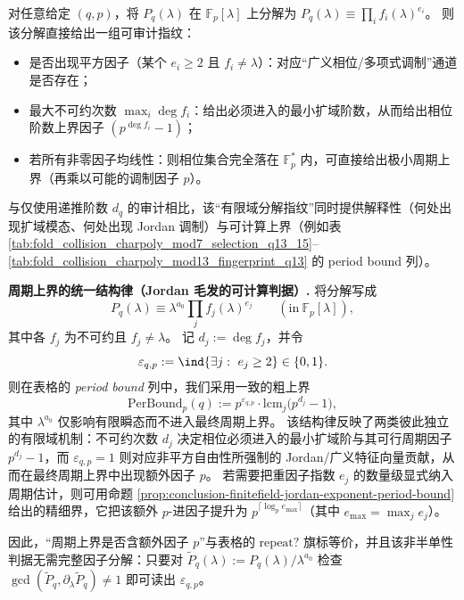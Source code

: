 \begin{remark}\label{rem:pom-charpoly-modp-audit-method}
对任意给定 \((q,p)\)，将 \(P_q(\lambda)\) 在 \(\mathbb{F}_p[\lambda]\) 上分解为
\(
P_q(\lambda)\equiv \prod_i f_i(\lambda)^{e_i}
 \)。
则该分解直接给出一组可审计指纹：
\begin{itemize}
  \item 是否出现平方因子（某个 \(e_i\ge 2\) 且 \(f_i\neq \lambda\)）：对应“广义相位/多项式调制”通道是否存在；
  \item 最大不可约次数 \(\max_i \deg f_i\)：给出必须进入的最小扩域阶数，从而给出相位阶数上界因子 \((p^{\deg f_i}-1)\)；
  \item 若所有非零因子均线性：则相位集合完全落在 \(\mathbb{F}_p^\ast\) 内，可直接给出极小周期上界（再乘以可能的调制因子 \(p\)）。
\end{itemize}
与仅使用递推阶数 \(d_q\) 的审计相比，该“有限域分解指纹”同时提供解释性（何处出现扩域模态、何处出现 Jordan 调制）与可计算上界（例如表 \ref{tab:fold_collision_charpoly_mod7_selection_q13_15}--\ref{tab:fold_collision_charpoly_mod13_fingerprint_q13} 的 period bound 列）。
\par
\textbf{周期上界的统一结构律（Jordan 毛发的可计算判据）.}
将分解写成
\[
P_q(\lambda)\equiv \lambda^{a_0}\prod_{j} f_j(\lambda)^{e_j}\qquad(\mathrm{in}\ \mathbb{F}_p[\lambda]),
\]
其中各 \(f_j\) 为不可约且 \(f_j\neq \lambda\)。
记 \(d_j:=\deg f_j\)，并令
\[
\varepsilon_{q,p}:=\ind\{\exists j:\ e_j\ge 2\}\in\{0,1\}.
\]
则在表格的 \emph{period bound} 列中，我们采用一致的粗上界
\[
\mathrm{PerBound}_p(q):=
p^{\varepsilon_{q,p}}\cdot \mathrm{lcm}_{j}\bigl(p^{d_j}-1\bigr),
\]
其中 \(\lambda^{a_0}\) 仅影响有限瞬态而不进入最终周期上界。
该结构律反映了两类彼此独立的有限域机制：不可约次数 \(d_j\) 决定相位必须进入的最小扩域阶与其可行周期因子 \(p^{d_j}-1\)，而 \(\varepsilon_{q,p}=1\) 则对应非平方自由性所强制的 Jordan/广义特征向量贡献，从而在最终周期上界中出现额外因子 \(p\)。
若需要把重因子指数 \(e_j\) 的数量级显式纳入周期估计，则可用命题 \ref{prop:conclusion-finitefield-jordan-exponent-period-bound} 给出的精细界，它把该额外 \(p\)-进因子提升为 \(p^{\lceil\log_p e_{\max}\rceil}\)（其中 \(e_{\max}=\max_j e_j\)）。
\par
因此，“周期上界是否含额外因子 \(p\)”与表格的 \(\mathrm{repeat?}\) 旗标等价，并且该非半单性判据无需完整因子分解：只要对 \(\widetilde P_q(\lambda):=P_q(\lambda)/\lambda^{a_0}\) 检查
\(\gcd(\widetilde P_q,\partial_\lambda\widetilde P_q)\neq 1\) 即可读出 \(\varepsilon_{q,p}\)。
\end{remark}

